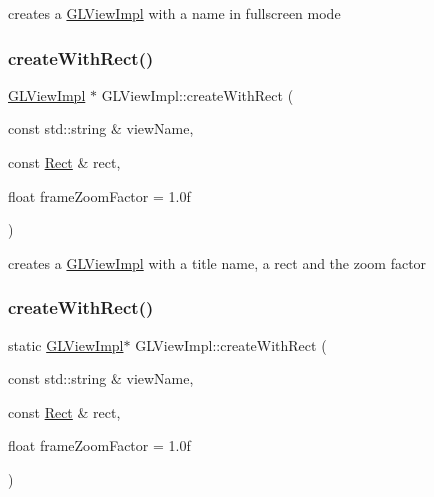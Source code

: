 creates a \hyperlink{classGLViewImpl}{G\+L\+View\+Impl} with a name in fullscreen mode \mbox{\label{classGLViewImpl_a390d6b69d0ff4829102833b284a00e9a}} 
\subsubsection{\texorpdfstring{create\+With\+Rect()}{createWithRect()}\hspace{0.1cm}{\footnotesize\ttfamily [1/2]}}
{\footnotesize\ttfamily \hyperlink{classGLViewImpl}{G\+L\+View\+Impl} $\ast$ G\+L\+View\+Impl\+::create\+With\+Rect (\begin{DoxyParamCaption}\item[{const std\+::string \&}]{view\+Name,  }\item[{const \hyperlink{classRect}{Rect} \&}]{rect,  }\item[{float}]{frame\+Zoom\+Factor = {\ttfamily 1.0f} }\end{DoxyParamCaption})\hspace{0.3cm}{\ttfamily [static]}}

creates a \hyperlink{classGLViewImpl}{G\+L\+View\+Impl} with a title name, a rect and the zoom factor \mbox{\label{classGLViewImpl_a648bf13566b44143089c39d890120a39}} 
\subsubsection{\texorpdfstring{create\+With\+Rect()}{createWithRect()}\hspace{0.1cm}{\footnotesize\ttfamily [2/2]}}
{\footnotesize\ttfamily static \hyperlink{classGLViewImpl}{G\+L\+View\+Impl}$\ast$ G\+L\+View\+Impl\+::create\+With\+Rect (\begin{DoxyParamCaption}\item[{const std\+::string \&}]{view\+Name,  }\item[{const \hyperlink{classRect}{Rect} \&}]{rect,  }\item[{float}]{frame\+Zoom\+Factor = {\ttfamily 1.0f} }\end{DoxyParamCaption})\hspace{0.3cm}{\ttfamily [static]}}


